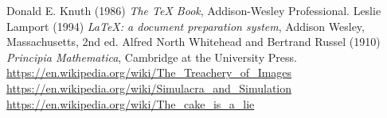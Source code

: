 


%

\begin{thebibliography}{9}
		Donald E. Knuth (1986) \emph{The \TeX{} Book}, Addison-Wesley Professional.
		Leslie Lamport (1994) \emph{\LaTeX: a document preparation system}, Addison Wesley, Massachusetts, 2nd ed.
		Alfred North Whitehead and Bertrand Russel (1910) \emph{Principia Mathematica}, Cambridge at the University Press.
		\url{https://en.wikipedia.org/wiki/The_Treachery_of_Images}
		\url{https://en.wikipedia.org/wiki/Simulacra_and_Simulation}
		\url{https://en.wikipedia.org/wiki/The_cake_is_a_lie}
\end{thebibliography}

\listoffigures
\listoftables